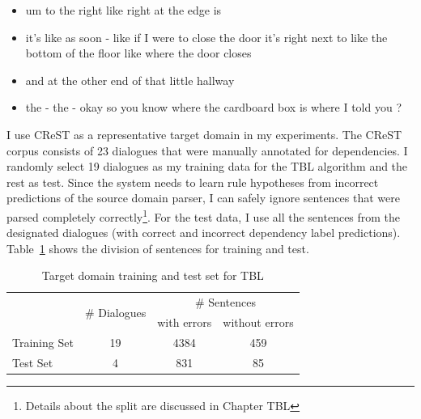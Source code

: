 \begin{itemize}
    \item um to the right like right at the edge is
    \item it's like as soon - like if I were to close the door it's right next to like the  bottom of the floor like where the door closes
    \item and at the other end of that little hallway
    \item the - the - okay so you know where the cardboard box is where I told you ? 
\end{itemize}

I use CReST as a representative target domain in my experiments. The CReST corpus consists of 23 dialogues that were manually annotated for dependencies. I randomly select 19 dialogues as my training data for the TBL algorithm and the rest as test. Since the system needs to learn rule hypotheses from incorrect predictions of the source domain parser, I can safely ignore sentences that were parsed completely correctly\footnote{Details about the split are discussed in Chapter TBL }. For the test data, I use all the sentences from the designated dialogues (with correct and incorrect dependency label predictions). 
Table~\ref{tab:sentdiv} shows the division of sentences for training and test.

\begin{table}[t]
\centering
\begin{tabular}{l|l|c|c}
& \multirow{2}{*}{\# Dialogues} & \multicolumn{2}{c}{\# Sentences} \\ \cline{3-4}
 &  & \multicolumn{1}{l|}{with errors} & \multicolumn{1}{l}{without errors} \\ \hline
Training Set & \multicolumn{1}{|c|}{19} & 4384 & 459 \\
Test Set & \multicolumn{1}{|c|}{4} & 831 & 85 \\ \hline
\end{tabular}
\caption{Target domain training and test set for TBL}
\label{tab:sentdiv}
\end{table}

